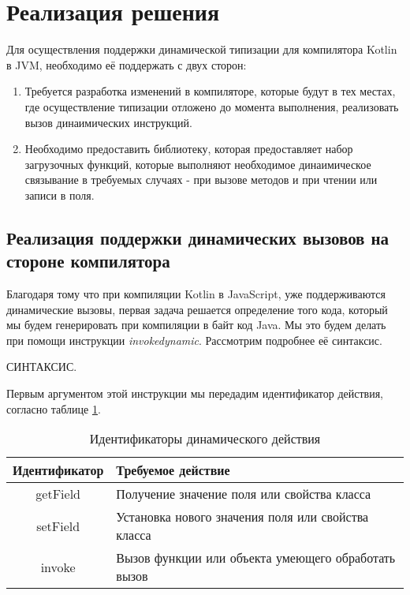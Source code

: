 \section{Реализация решения}

Для осуществления поддержки динамической типизации для компилятора Kotlin в JVM, необходимо её поддержать с двух сторон:

\begin{enumerate}
    \item Требуется разработка изменений в компиляторе, которые будут в тех местах, где осуществление типизации отложено до момента выполнения, реализовать вызов динаимических инструкций.
    \item Необходимо предоставить библиотеку, которая предоставляет набор загрузочных функций, которые выполняют необходимое динаимическое связывание в требуемых случаях - при вызове методов и при чтении или записи в поля.
\end{enumerate}

\subsection{Реализация поддержки динамических вызовов на стороне компилятора}
\label{sec:compileRealization}

Благодаря тому что при компиляции Kotlin в JavaScript, уже поддерживаются динамические вызовы, первая задача решается определение того кода, который мы будем генерировать при компиляции в байт код Java. Мы это будем делать при помощи инструкции \textit{invokedynamic}.
Рассмотрим подробнее её синтаксис.

СИНТАКСИС.

Первым аргументом этой инструкции мы передадим идентификатор действия, согласно таблице \ref{tab:DynamicCallType}. 

\begin{table}[h]
\caption{\label{tab:DynamicCallType}Идентификаторы динамического действия}
\begin{center}
\begin{tabular}{|c|l|}
\hline
Идентификатор	& Требуемое действие \\
\hline
getField & Получение значение поля или свойства класса  \\
setField & Установка нового значения поля или свойства класса	\\
invoke   & Вызов функции или объекта умеющего обработать вызов  \\
\hline
\end{tabular}
\end{center}
\end{table} 


